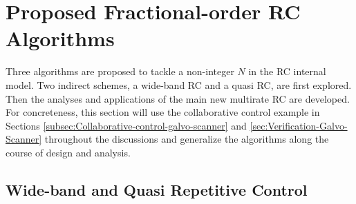 \documentclass [11pt, proquest] {uwthesis}[2020/02/24]
\begin{document}
\section{Proposed Fractional-order RC Algorithms} \label{sec:Proposed-Fractional-order-RC}

Three algorithms are proposed to tackle a non-integer $N$ in the
RC internal model. Two indirect schemes, a wide-band RC and a quasi
RC, are first explored. Then the analyses and applications of the
main new multirate RC are developed. For concreteness, this section
will use the collaborative control example in Sections \ref{subsec:Collaborative-control-galvo-scanner}
and \ref{sec:Verification-Galvo-Scanner} throughout the discussions and
generalize the algorithms along the course of design and analysis.

\subsection{Wide-band and Quasi Repetitive Control} \label{subsec:Wide-band-and-quasi-RC}
\end{document}
